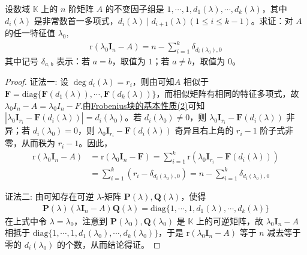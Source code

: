 \documentclass[../../main.tex]{subfiles}
\begin{document}
\begin{proposition}\label{proposition:特征值对应的特征矩阵的秩与不变因子组的关系}
设数域 $\mathbb{K}$ 上的 $n$ 阶矩阵 $A$ 的不变因子组是 $1,\cdots,1,d_1(\lambda),\cdots,d_k(\lambda)$，其中 $d_i(\lambda)$ 是非常数首一多项式，$d_i(\lambda)\mid d_{i + 1}(\lambda) (1\leqslant  i\leqslant  k - 1)$。求证：对 $A$ 的任一特征值 $\lambda_0$,
\begin{align*}
\mathrm{r}(\lambda_0\boldsymbol{I}_n - A)=n - \sum_{i = 1}^{k}\delta_{d_i(\lambda_0),0}
\end{align*}
其中记号 $\delta_{a,b}$ 表示：若 $a = b$，取值为 $1$；若 $a\neq b$，取值为 $0$。
\end{proposition}
\begin{proof}
{\color{blue}证法一:}
设 $\deg d_i(\lambda)=r_i$，则由可知$A$ 相似于 $\boldsymbol{F}=\mathrm{diag}\{\boldsymbol{F}(d_1(\lambda)),\cdots,\boldsymbol{F}(d_k(\lambda))\}$，而相似矩阵有相同的特征多项式，故$\lambda_0I_n-A=\lambda_0I_n-F$.由\hyperref[lemma:Frobenius标准型矩阵的极小多项式和不变因子]{Frobenius块的基本性质(2)}可知$|\lambda_0\boldsymbol{I}_{r_i}-\boldsymbol{F}(d_i(\lambda))|=d_i(\lambda_0)$。若 $d_i(\lambda_0)\neq 0$，则 $\lambda_0\boldsymbol{I}_{r_i}-\boldsymbol{F}(d_i(\lambda))$ 非异；若 $d_i(\lambda_0)=0$，则 $\lambda_0\boldsymbol{I}_{r_i}-\boldsymbol{F}(d_i(\lambda))$ 奇异且右上角的 $r_i - 1$ 阶子式非零，从而秩为 $r_i - 1$。因此，
\begin{align*}
\mathrm{r}(\lambda_0\boldsymbol{I}_n - A)&=\mathrm{r}(\lambda_0\boldsymbol{I}_n - \boldsymbol{F})=\sum_{i = 1}^{k}\mathrm{r}(\lambda_0\boldsymbol{I}_{r_i}-\boldsymbol{F}(d_i(\lambda)))\\
&=\sum_{i = 1}^{k}(r_i - \delta_{d_i(\lambda_0),0})=n - \sum_{i = 1}^{k}\delta_{d_i(\lambda_0),0}
\end{align*}

{\color{blue}证法二:}
由可知存在可逆 $\lambda$-矩阵 $\boldsymbol{P}(\lambda),\boldsymbol{Q}(\lambda)$，使得
\begin{align*}
\boldsymbol{P}(\lambda)(\lambda\boldsymbol{I}_n - A)\boldsymbol{Q}(\lambda)=\mathrm{diag}\{1,\cdots,1,d_1(\lambda),\cdots,d_k(\lambda)\}
\end{align*}
在上式中令 $\lambda = \lambda_0$，注意到 $\boldsymbol{P}(\lambda_0),\boldsymbol{Q}(\lambda_0)$ 是 $\mathbb{K}$ 上的可逆矩阵，故 $\lambda_0\boldsymbol{I}_n - A$ 相抵于 $\mathrm{diag}\{1,\cdots,1,d_1(\lambda_0),\cdots,d_k(\lambda_0)\}$，于是 $\mathrm{r}(\lambda_0\boldsymbol{I}_n - A)$ 等于 $n$ 减去等于零的 $d_i(\lambda_0)$ 的个数，从而结论得证。
\end{proof}
\end{document}
